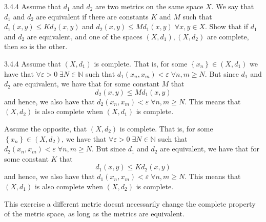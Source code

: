 \documentclass[a4paper,norsk]{article}
\renewcommand{\geq}{\geqslant}
\renewcommand{\leq}{\leqslant}
\renewcommand{\epsilon}{\varepsilon}
\begin{document}
\begin{oppgavebox}{3.4.4}{}
Assume that $ d_1 $ and $ d_2 $ are two metrics on the same space $ X $. We say that $ d_1 $ and $ d_2 $ are equivalent if there are constants $ K $ and $ M $ such that $ d_1 \left( x, y \right) \leq K d_2 \left( x, y \right)  $ and $ d_2 \left( x, y \right) \leq M d_1 \left( x, y \right) \; \forall x, y \in X $. Show that if $ d_1 $ and $ d_2 $ are equivalent, and one of the spaces $ \left( X, d_1 \right), \left( X, d_2 \right)   $ are complete, then so is the other.

\begin{proofbox}{3.4.4}{}
  Assume that $ \left( X, d_1 \right)  $ is complete. That is, for some $ \left\{ x_n \right\} \in  \left( X, d_1 \right)  $ we have that $ \forall \epsilon > 0 \; \exists  N \in \mathbb{N} $ such that $ d_1(x_n, x_m) < \epsilon  \; \forall  n,m \geq N $. But since $ d_1 $ and $ d_2 $ are equivalent, we have that for some constant $ M $ that
  \[
      d_2(x,y) \leq M d_1(x,y)
  \]
  and hence, we also have that $ d_2 \left( x_n, x_m \right) < \epsilon  \; \forall n, m \geq N $. This means that $ \left( X, d_2 \right)  $ is also complete when $ \left( X, d_1 \right)  $ is complete.


  Assume the opposite, that $ \left( X, d_2 \right)  $ is complete. That is, for some $ \left\{ x_n  \right\} \in  \left( X, d_2 \right)  $, we have that $ \forall \epsilon > 0 \; \exists N \in \mathbb{N} $ such that $ d_2 \left( x_n, x_m  \right) < \epsilon  \; \forall n, m \geq N  $. But since $ d_1 $ and $ d_2 $ are equivalent, we have that for some constant $ K $ that 
  \[
      d_1 \left( x, y \right) \leq K d_2 \left( x, y \right) 
  \]
  and hence, we also have that $ d_1 \left( x_n, x_m \right) < \epsilon  \; \forall  n, m \geq N $. This means that $ \left( X, d_1 \right)  $ is also complete when $ \left( X, d_2 \right)  $ is complete. 


  This exercise a different metric doesnt necessarily change the complete property of the metric space, as long as the metrics are equivalent.
\end{proofbox}
\end{oppgavebox}
\end{document}
